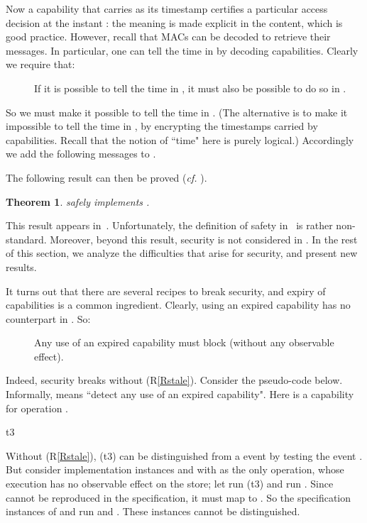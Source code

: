\documentclass[10pt]{article}
\makeatletter
\newtheorem{theorem}{Theorem}
\newcounter{Crules}
\newcommand{\R}{\addtocounter{Crules}{1}R\arabic{Crules}\gdef\@currentlabel{\arabic{Crules}}}
\makeatother
\begin{document}
Now a capability that carries  as its timestamp certifies a particular access decision at the instant : the meaning is made explicit in the content, which is good practice. However, recall that MACs can be decoded to retrieve their messages. In particular, one can tell the time in  by decoding capabilities. Clearly we require that:
\begin{description}
\item[\R]\label{Rtime} If it is possible to tell the time in , it must also be possible to do so in .
\end{description}
So we must make it possible to tell the time in . 
(The alternative is to make it impossible to tell the time in , by encrypting the timestamps carried by capabilities. Recall that the notion of ``time" here is purely logical.) 
Accordingly we add the following messages to .

The following result can then be proved (\emph{cf.} \cite{ForteChaudhuriA06}). \begin{theorem}
 safely implements .
\end{theorem}
\noindent
This result appears in~\cite{ForteChaudhuriA06}. Unfortunately, the definition of safety in~\cite{ForteChaudhuriA06} is rather non-standard. Moreover, beyond this result, security is not considered in \cite{ForteChaudhuriA06}. In the rest of this section, we analyze the difficulties that arise for security, and present new results. 

It turns out that there are several recipes to break security, and expiry of capabilities is a common ingredient. Clearly, using an expired capability has no counterpart in . So:
\begin{description}
\item[\R]\label{Rstale} Any use of an expired capability must block (without any observable effect). 
\end{description}
Indeed, security breaks without (R\ref{Rstale}). Consider the  pseudo-code below. Informally,  means ``detect any use of an expired capability". Here  is a capability for operation .
\begin{description}
\item[t3] 
\end{description}
\noindent
Without (R\ref{Rstale}), (t3) can be distinguished from a  event by testing the event . But consider implementation instances  and  with  as the only operation, whose execution has no observable effect on the store; let  run (t3) and  run . Since  cannot be reproduced in the specification, it must map to . So the specification instances of  and  run  and . These instances cannot be distinguished. 
\end{document}
